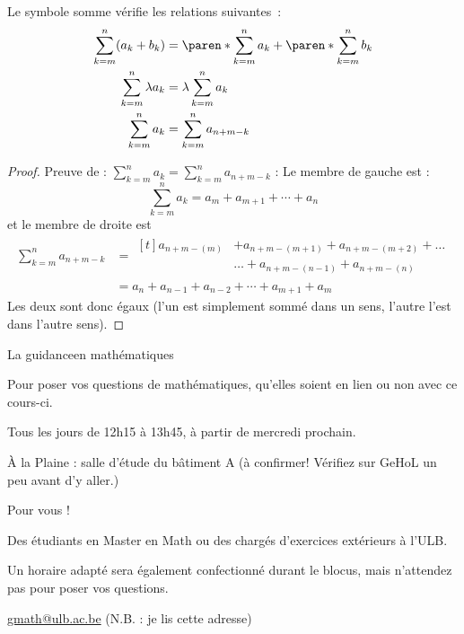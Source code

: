 \begin{frame}
  \begin{property}Le symbole somme vérifie les relations suivantes~:
    \begin{align*}
      \sum_{k = m}^{n} (a_{k}+b_{k}) &= \paren*{\sum_{k = m}^{n} a_{k}} + \paren*{\sum_{k = m}^{n} b_{k}}\\
      \sum_{k = m}^{n} \lambda a_{k} &= \lambda \sum_{k = m}^{n} a_{k}\\
      \sum_{k = m}^{n} a_{k} &= \sum_{k = m}^{n} a_{n+m-k}
    \end{align*}
  \end{property}
\end{frame}
\begin{frame}
  \begin{proof}
    Preuve de : \(\sum_{k = m}^{n} a_{k} = \sum_{k = m}^{n} a_{n+m-k}\) : Le membre de gauche est :
    \begin{equation*}
      \sum_{k = m}^{n} a_{k} = a_{m} + a_{m+1} + \cdots + a_{n}
    \end{equation*}
    et le membre de droite est
    \begin{align*}
      \sum_{k = m}^{n} a_{n+m-k} &= \begin{aligned}[t]
        a_{n+m-(m)} &+ a_{n+m-(m+1)} + a_{n+m-(m+2)} + \ldots\\
        &\ldots + a_{n+m-(n-1)} + a_{n+m-(n)}
      \end{aligned}\\
                                 &= a_{n} + a_{n-1} + a_{n-2} + \cdots + a_{m+1} + a_{m}
    \end{align*}
    Les deux sont donc égaux (l'un est simplement sommé dans un sens, l'autre l'est dans l'autre sens).
  \end{proof}
\end{frame}
\begin{frame}{La guidance}{en mathématiques}
  \begin{description}[<+->]
  \item[Qu'est-ce ?] Pour poser vos questions de mathématiques, qu'elles soient en lien ou non avec ce cours-ci.
  \item[Quand ?] Tous les jours de 12h15 à 13h45, à partir de mercredi prochain.
  \item[Où ?] À la Plaine : salle d'étude du bâtiment A (à confirmer! Vérifiez sur GeHoL un peu avant d'y aller.)
  \item[Pour qui ?] Pour vous !
  \item[Par qui ?] Des étudiants en Master en Math ou des chargés d'exercices extérieurs à l'ULB.
  \item[En blocus ?] Un horaire adapté sera également confectionné durant le blocus, mais n'attendez pas pour poser vos questions.
  \item[Qui contacter ?] \url{gmath@ulb.ac.be} (N.B. : je lis cette adresse)
  \end{description}

\end{frame}
